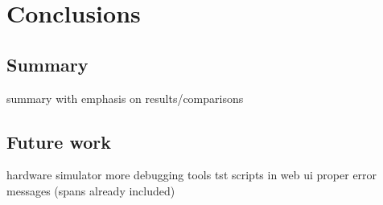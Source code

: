 \section{Conclusions}
\subsection{Summary}
summary with emphasis on results/comparisons
\subsection{Future work} \label{future-work}
hardware simulator
more debugging tools
tst scripts in web ui
proper error messages (spans already included)
